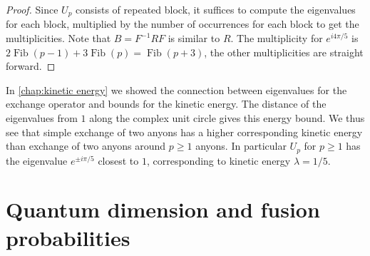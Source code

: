 \documentclass[a4paper,10pt,oneside]{book}
\theoremstyle{plain}
\newtheorem{corollary}[theorem]{Corollary}
\theoremstyle{definition}
\theoremstyle{remark}
\DeclareMathOperator{\Fib}{Fib}
\begin{document}
\begin{proof}
  Since $U_p$ consists of repeated block, it suffices to compute the eigenvalues for each block, multiplied by the number of occurrences for each block to get the multiplicities. Note that $B = F^{-1}R F$ is similar to $R$. The multiplicity for $e^{i4π/5}$ is $2\Fib(p-1) + 3\Fib(p) = \Fib(p+3)$, the other multiplicities are straight forward.
\end{proof}

In \cref{chap:kinetic energy} we showed the connection between eigenvalues for the exchange operator and bounds for the kinetic energy. The distance of the eigenvalues from $1$ along the complex unit circle gives this energy bound. We thus see that simple exchange of two anyons has a higher corresponding kinetic energy than exchange of two anyons around $p \ge 1$ anyons. In particular $U_p$ for $p \ge 1$ has the eigenvalue $e^{\pm iπ/5}$ closest to $1$, corresponding to kinetic energy $λ = 1/5$.













\section{Quantum dimension and fusion probabilities}
\end{document}

